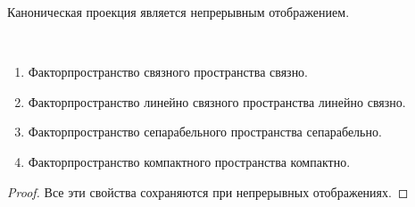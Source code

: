 \documentclass[12pt,a4paper]{article}
\begin{document}
    \begin{remark*}
        Каноническая проекция является непрерывным отображением.
    \end{remark*}

    \begin{lemma}\ 
        \begin{enumerate}
            \item Факторпространство связного пространства связно.
            \item Факторпространство линейно связного пространства линейно связно.
            \item Факторпространство сепарабельного пространства сепарабельно.
            \item Факторпространство компактного пространства компактно.
        \end{enumerate}
    \end{lemma}

    \begin{proof}
        Все эти свойства сохраняются при непрерывных отображениях.
    \end{proof}
\end{document}
